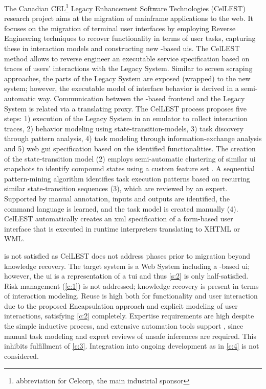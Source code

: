 The Canadian CEL\footnote{abbreviation for Celcorp, the main industrial sponsor} Legacy Enhancement Software Technologies (CelLEST) \autocite{Stroulia2003,Stroulia2002,Stroulia2002Book,El-Ramly2002,Stroulia1999,Kong1999} research project aims at the migration of  mainframe applications to the \gls{web}.
It focuses on the migration of  terminal user interfaces by employing \gls{Reverse Engineering} techniques to recover functionality in terms of user tasks, capturing these in interaction models and constructing new -based \glspl{ui}.
The CelLEST method allows to reverse engineer an executable service specification based on traces of users' interactions with the \gls{Legacy System}.
Similar to screen scraping approaches, the parts of the \gls{Legacy System} are exposed (wrapped) to the new system; however, the executable model of  interface behavior is derived in a semi-automatic way.
Communication between the -based frontend and the \gls{Legacy System} is related via a translating proxy.
The CelLEST process proposes five steps: 1) execution of the \gls{Legacy System} in an emulator to collect interaction traces, 2) behavior modeling using state-transition-models, 3) task discovery through pattern analysis, 4) task modeling through information-exchange analysis and 5) \gls{web} \gls{gui} specification based on the identified functionalities.
The creation of the state-transition model (2) employs semi-automatic clustering of similar \gls{ui} snapshots to identify compound states using a custom feature set \autocite{Stroulia1999}.
A sequential pattern-mining algorithm \autocite{El-Ramly2002} identifies task execution patterns based on recurring similar state-transition sequences (3), which are reviewed by an expert.
Supported by manual annotation, inputs and outputs are identified, the command language is learned, and the task model is created manually (4).
CelLEST automatically creates an \gls{xml} specification of a form-based user interface that is executed in runtime interpreters translating to XHTML or WML.

 is not satisfied as CelLEST does not address phases prior to migration beyond knowledge recovery.
The \gls{target system} is a \gls{Web System} including a -based \gls{ui}; however, the \gls{ui} is a representation of a \gls{tui} and thus \cref{s:2} is only half-satisfied.
Risk management (\cref{c:1}) is not addressed; knowledge recovery is present in terms of interaction modeling.
Reuse is high both for  functionality and user interaction due to the proposed \gls{Encapsulation} approach and explicit modeling of user interactions, satisfying \cref{c:2} completely.
Expertise requirements are high despite the simple inductive process, and extensive automation tools support \autocite{Stroulia2002}, since manual task modeling and expert reviews of unsafe inferences are required.
This inhibits fulfillment of \cref{c:3}.
Integration into ongoing development as in \cref{c:4} is not considered.

